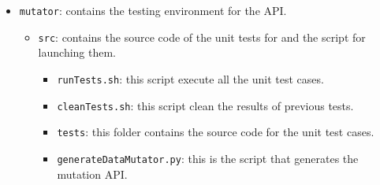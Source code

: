 \begin{itemize}
{\begin{itemize}
\begin{itemize}
\begin{itemize}
			\item \texttt{get\_operator\_coverage.py}: this script analizes the results of the operator coverage.
			\item \texttt{get\_stats.py}: this script produces statistics from the mutants' execution.
			\item \texttt{get\_final\_results.py}: this script produces a summary of the execution of \DAMA.
		\end{itemize}%
		\item \texttt{pipeline\_scripts}: a folder containing the four scripts that make up the \DAMA pipeline:
		\begin{itemize}%
			\item \texttt{DAMAt\_obtain\_coverage.sh}: this script obtains fault model coverage data in order to execute only the tests that cover each mutant.
			\item \texttt{get\_mutant\_test\_list.py}: this script produces the list of test against which avery mutant shall be executed.
			\item \texttt{DAMAt\_compile\_and\_run\_mutants.sh}: this scripts compile each mutant and run it against the SUT test suite.
			\item \texttt{DAMAt\_data\_analysis.sh}: this script executes all the data analysis steps at the end of the execution of the \DAMA pipeline
		\end{itemize}%
		\item \texttt{fault\_model.csv}: an example of a \DAMA fault model in csv format.
		\item \texttt{tests.csv }: an example of list of test cases and nominal times in csv format.
	\end{itemize}%
	\item \texttt{mutator}: contains the testing environment for the \DAMA API.
	\begin{itemize}%
		\item \texttt{src}: contains the source code of the unit tests for \DAMA and the script for launching them.
		\begin{itemize}%
			\item \texttt{runTests.sh}: this script execute all the unit test cases.
			\item \texttt{cleanTests.sh}: this script clean the results of previous tests.
			\item \texttt{tests}: this folder contains the source code for the unit test cases.
			\item \texttt{generateDataMutator.py}: this is the script that generates the \DAMA mutation API.

\end{itemize}
\end{itemize}
\end{itemize}}
\end{itemize}
